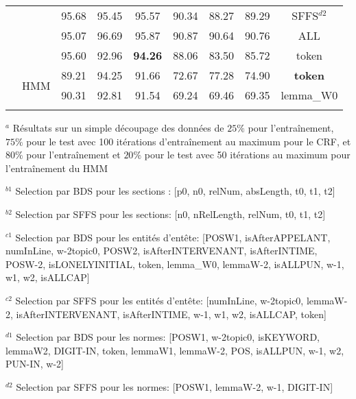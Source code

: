 \begin{table}[!h]
\begin{center}
\begin{tabular}{l|c|ccc|ccc|c}
				&  & 95.68 & 95.45 & 95.57 & 90.34 & 88.27 & 89.29 & SFFS$^{d2}$ \\ 
                &  & 95.07 & 96.69 & 95.87 & 90.87 & 90.64 & 90.76 & ALL \\
                &  & 95.60 & 92.96 & \textbf{94.26} & 88.06 & 83.50 & 85.72 & token \\ \cline{2-9}
                 &  \multirow{2}{*}{HMM} & 89.21 & 94.25 & 91.66 & 72.67 & 77.28 & 74.90 &  \textbf{token} \\ 
  &   & 90.31 & 92.81 & 91.54 & 69.24 & 69.46 & 69.35 &  lemma\_W0 \\ 
\noalign{\smallskip}\hline\noalign{\smallskip}
\end{tabular}
\end{center}

$^a$ Résultats sur un simple découpage des données de $25\%$ pour l'entraînement,  $75\%$ pour le test avec 100 itérations d'entraînement au maximum  pour le CRF, et $80\%$ pour l'entraînement et $20\%$ pour le test avec 50 itérations au maximum pour l'entraînement du HMM

$^{b1}$ Selection par BDS pour les sections : [p0, n0, relNum, absLength, t0, t1, t2]

$^{b2}$ Selection par SFFS pour les sections: [n0, nRelLength, relNum, t0, t1, t2]

 $^{c1}$ Selection par BDS pour les entités d'entête:  [POSW1, isAfterAPPELANT, numInLine, w-2topic0, POSW2, isAfterINTERVENANT, isAfterINTIME, POSW-2, isLONELYINITIAL, token, lemma\_W0, lemmaW-2, isALLPUN, w-1, w1, w2, isALLCAP]

$^{c2}$ Selection par SFFS pour les  entités d'entête: [numInLine, w-2topic0, lemmaW-2, isAfterINTERVENANT, isAfterINTIME, w-1, w1, w2, isALLCAP, token]

$^{d1}$ Selection par BDS pour les normes: [POSW1, w-2topic0, isKEYWORD, lemmaW2, DIGIT-IN, token, lemmaW1, lemmaW-2, POS, isALLPUN, w-1, w2, PUN-IN, w-2]

$^{d2}$ Selection par SFFS pour les normes: [POSW1, lemmaW-2, w-1, DIGIT-IN]
\end{table}



